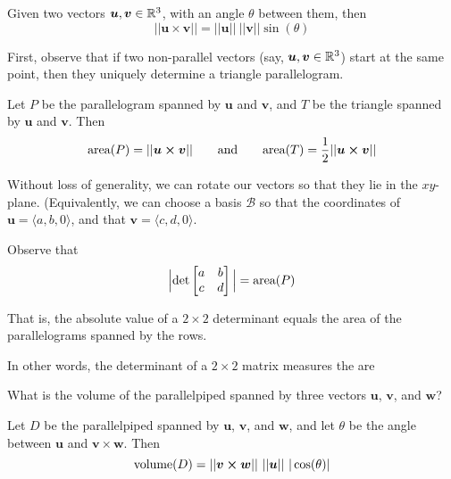
\begin{proposition}
        Given two vectors $\bm{u}, \bm{v} \in \mathbb{R}^3$, with an angle $\theta$ between them, then $$||\bm{u \times v}|| = ||\bm{u}|| \ ||\bm{v}|| \sin(\theta)$$
    \end{proposition}
    
First, observe that if two non-parallel vectors (say, $\bm{u}, \bm{v} \in \mathbb{R}^3$) start at the same point, then they uniquely determine a triangle parallelogram.


\begin{theorem}
    Let $P$ be the parallelogram spanned by $\bm{u}$ and $\bm{v}$, and $T$ be the triangle spanned by $\bm{u}$ and $\bm{v}$. Then
    $$\textnormal{area}(P) = ||\bm{u \times v}|| \qquad \textnormal{and} \qquad \textnormal{area}(T) = \frac{1}{2}||\bm{u \times v}||$$
\end{theorem}

Without loss of generality, we can rotate our vectors so that they lie in the $xy$-plane.  (Equivalently, we can choose a basis $\mathcal{B}$ so that the coordinates of $\bm{u} = \langle a, b, 0 \rangle$, and that $\bm{v} = \langle c, d, 0 \rangle$.

Observe that \begin{equation*}
        \Big|\textnormal{det}\begin{bmatrix}
a & b \\
c & d
\end{bmatrix}\Big| = \textnormal{area}(P)
    \end{equation*}
    
       That is, the absolute value of a $2 \times 2$
determinant equals the area of the parallelograms spanned by the rows.


In other words, the determinant of a $2 \times 2$ matrix measures the are 

\begin{motivating}
What is the volume of the parallelpiped spanned by three vectors $\bm{u}$, $\bm{v}$, and $\bm{w}$?
\end{motivating}




\begin{theorem}
    Let $D$ be the parallelpiped spanned by $\bm{u}$, $\bm{v}$, and $\bm{w}$, and let $\theta$ be the angle between $\bm{u}$ and $\bm{v \times w}$. Then $$\textnormal{volume}(D) = ||\bm{v \times w}|| \ ||\bm{u}|| \ |\cos(\theta)|$$
    \end{theorem}

